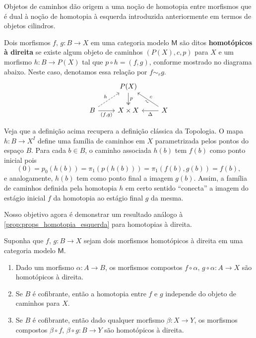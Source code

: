 Objetos de caminhos dão origem a uma noção de homotopia entre morfismos que é dual à noção de homotopia à esquerda introduzida anteriormente em termos de objetos cilindros.

\begin{defin}\label{defin:homotopia_direita}
  Dois morfismos $f,\, g: B \to X$ em uma categoria modelo $\mathsf{M}$ são ditos \textbf{homotópicos à direita} se existe algum objeto de caminhos $(P(X),c,p)$ para $X$ e um morfismo $h: B \to P(X)$ tal que $p \circ h = (f,g)$, conforme mostrado no diagrama abaixo.
  Neste caso, denotamos essa relação por $f \sim_{r} g$.
  \begin{displaymath}
    \begin{tikzcd}
      & P(X)
      \arrow[d, two heads, "p"]
      \\ B
      \arrow[ru, dashed, "h"]
      \arrow[r, "{(f,g)}" swap]
      & X \times X
      & X
      \arrow[lu, "\sim" {sloped, swap}, "c" swap]
      \arrow[l, "\Delta"]
    \end{tikzcd}
  \end{displaymath}
\end{defin}

Veja que a definição acima recupera a definição clássica da Topologia.
O mapa $h: B \to X^{I}$ define uma família de caminhos em $X$ parametrizada pelos pontos do espaço $B$.
Para cada $b \in B$, o caminho associada $h(b)$ tem $f(b)$ como ponto inicial pois
\begin{displaymath}
  [h(b)](0) = p_{0}(h(b)) = \pi_{1}(p(h(b))) = \pi_{1}(f(b),g(b)) = f(b),
\end{displaymath}
e analogamente, $h(b)$ tem como ponto final a imagem $g(b)$.
Assim, a família de caminhos definida pela homotopia $h$ em certo sentido ``conecta'' a imagem do estágio inicial $f$ da homotopia ao estágio final $g$ da mesma.

Nosso objetivo agora é demonstrar um resultado análogo à \cref{prop:props_homotopia_esquerda} para homotopias à direita.

\begin{prop}\label{prop:props_homotopia_direita}
  Suponha que $f,\,g: B \to X$ sejam dois morfismos homotópicos à direita em uma categoria modelo $\mathsf{M}$.
  \begin{enumerate}
  \item Dado um morfismo $\alpha: A \to B$, os morfismos compostos $f \circ \alpha,\, g \circ \alpha: A \to X$ são homotópicos à direita.
    
  \item Se $B$ é cofibrante, então a homotopia entre $f$ e $g$ independe do objeto de caminhos para $X$.
    
  \item Se $B$ é cofibrante, então dado qualquer morfismo $\beta: X \to Y$, os morfismos compostos $\beta \circ f,\, \beta \circ g: B \to Y$ são homotópicos à direita.
  \end{enumerate}
\end{prop}

